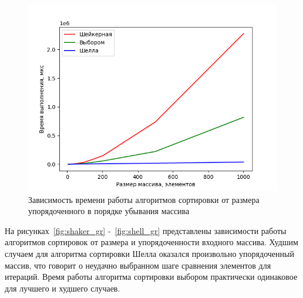 \documentclass[12pt]{report}
\begin{document}
    \begin{figure}[H]
        \centering
        \includegraphics[width=1\linewidth]{img/reverse_arrays}
        \caption{Зависимость времени работы алгоритмов сортировки от размера упорядоченного в порядке убывания массива}
        \label{fig:reverse_arrays}
    \end{figure}

    На рисунках~\ref{fig:shaker_gr} -~\ref{fig:shell_gr} представлены зависимости работы алгоритмов сортировок
    от размера и упорядоченности входного массива.
    Худшим случаем для алгоритма сортировки Шелла оказался произвольно упорядоченный массив,
    что говорит о неудачно выбранном шаге сравнения элементов для итераций.
    Время работы алгоритма сортировки выбором практически одинаковое для лучшего и худшего случаев.
\end{document}

